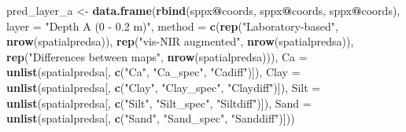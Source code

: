\documentclass[]{book}
\newenvironment{Shaded}{\begin{snugshade}}{\end{snugshade}}
\newcommand{\DataTypeTok}[1]{\textcolor[rgb]{0.13,0.29,0.53}{#1}}
\newcommand{\KeywordTok}[1]{\textcolor[rgb]{0.13,0.29,0.53}{\textbf{#1}}}
\newcommand{\NormalTok}[1]{#1}
\newcommand{\OperatorTok}[1]{\textcolor[rgb]{0.81,0.36,0.00}{\textbf{#1}}}
\newcommand{\StringTok}[1]{\textcolor[rgb]{0.31,0.60,0.02}{#1}}
\begin{document}
\begin{Shaded}
\begin{Highlighting}[]
\NormalTok{pred_layer_a <-}\StringTok{ }\KeywordTok{data.frame}\NormalTok{(}\KeywordTok{rbind}\NormalTok{(sppx}\OperatorTok{@}\NormalTok{coords, sppx}\OperatorTok{@}\NormalTok{coords, sppx}\OperatorTok{@}\NormalTok{coords), }\DataTypeTok{layer =} \StringTok{"Depth A (0 - 0.2 m)"}\NormalTok{, }
                    \DataTypeTok{method =} \KeywordTok{c}\NormalTok{(}\KeywordTok{rep}\NormalTok{(}\StringTok{"Laboratory-based"}\NormalTok{, }\KeywordTok{nrow}\NormalTok{(spatialpredsa)), }\KeywordTok{rep}\NormalTok{(}\StringTok{"vis-NIR augmented"}\NormalTok{, }
                                        \KeywordTok{nrow}\NormalTok{(spatialpredsa)), }\KeywordTok{rep}\NormalTok{(}\StringTok{"Differences between maps"}\NormalTok{, }\KeywordTok{nrow}\NormalTok{(spatialpredsa))), }
                    \DataTypeTok{Ca =} \KeywordTok{unlist}\NormalTok{(spatialpredsa[, }\KeywordTok{c}\NormalTok{(}\StringTok{"Ca"}\NormalTok{, }\StringTok{"Ca_spec"}\NormalTok{, }\StringTok{"Cadiff"}\NormalTok{)]), }\DataTypeTok{Clay =} \KeywordTok{unlist}\NormalTok{(spatialpredsa[, }
                                        \KeywordTok{c}\NormalTok{(}\StringTok{"Clay"}\NormalTok{, }\StringTok{"Clay_spec"}\NormalTok{, }\StringTok{"Claydiff"}\NormalTok{)]), }\DataTypeTok{Silt =} \KeywordTok{unlist}\NormalTok{(spatialpredsa[, }
                                        \KeywordTok{c}\NormalTok{(}\StringTok{"Silt"}\NormalTok{, }\StringTok{"Silt_spec"}\NormalTok{, }\StringTok{"Siltdiff"}\NormalTok{)]), }\DataTypeTok{Sand =} \KeywordTok{unlist}\NormalTok{(spatialpredsa[, }
                                        \KeywordTok{c}\NormalTok{(}\StringTok{"Sand"}\NormalTok{, }\StringTok{"Sand_spec"}\NormalTok{, }\StringTok{"Sanddiff"}\NormalTok{)]))}


\end{Highlighting}
\end{Shaded}
\end{document}
